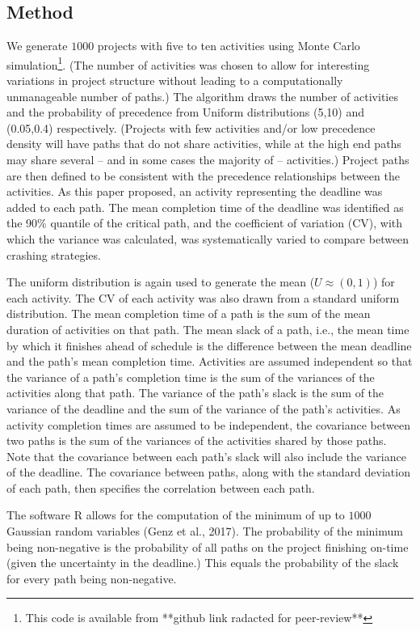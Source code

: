 \documentclass[11pt]{article}
\begin{document}
\subsection{Method}
We generate $1000$ projects with five to ten activities using Monte Carlo simulation\footnote{This code is available from **github link radacted for peer-review**}. (The number of activities was chosen to allow for interesting variations in project structure without leading to a computationally unmanageable number of paths.) The algorithm draws the number of activities and the probability of precedence from Uniform distributions (5,10) and (0.05,0.4) respectively. (Projects with few activities and/or low precedence density will have paths that do not share activities, while at the high end paths may share several -- and in some cases the majority of -- activities.) Project paths are then defined to be consistent with the precedence relationships between the activities. As this paper proposed, an activity representing the deadline was added to each path.  The mean completion time of the deadline was identified as the 90\% quantile of the critical path, and the coefficient of variation (CV), with which the variance was calculated, was systematically varied to compare between crashing strategies.
\par
The uniform distribution is again used to generate the mean ($U\approx(0,1)$) for each activity.  The CV of each activity was also drawn from a standard uniform distribution.  The mean completion time of a path is the sum of the mean duration of activities on that path. 
The mean slack of a path, i.e., the mean time by which it finishes ahead of schedule is the difference between the mean deadline and the path's mean completion time.   Activities are assumed independent so that the variance of a path's completion time is the sum of the variances of the activities along that path.   The variance of the path's slack is the sum of the variance of the deadline and the sum of the variance of the path's activities.
As activity completion times are assumed to be independent, the covariance between two paths is the sum of the variances of the activities shared by those paths. Note that the covariance between each path's slack will also include the variance of the deadline.  The covariance between paths, along with the standard deviation of each path, then specifies the correlation between each path.  
\par
The software R allows for the computation of the minimum of up to $1000$ Gaussian random variables (Genz et al., 2017).  The probability of the minimum being non-negative is the probability of all paths on the project finishing on-time (given the uncertainty in the deadline.) This equals the probability of the slack for every path being non-negative.
\end{document}
